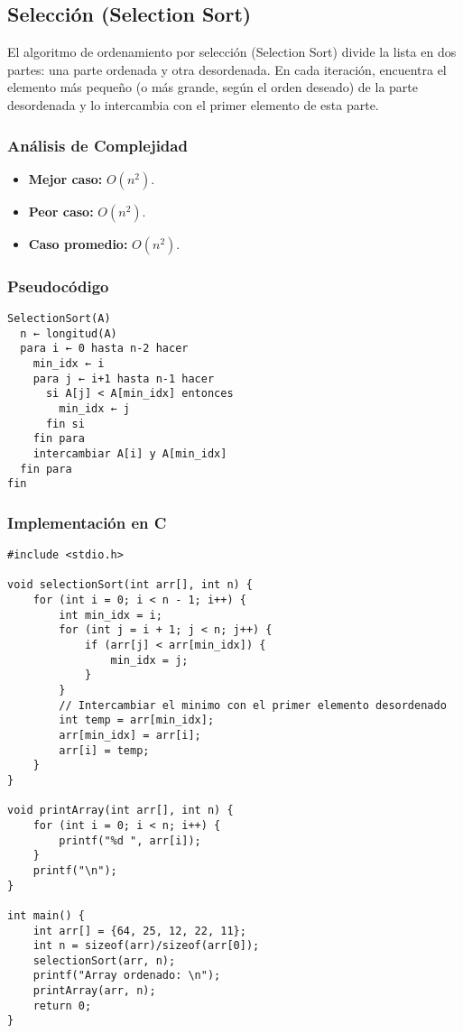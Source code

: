 \documentclass[11pt,openany]{book}
\begin{document}
\subsection{Selección (Selection Sort)}
El algoritmo de ordenamiento por selección (Selection Sort) divide la lista en dos partes: una parte ordenada y otra desordenada. En cada iteración, encuentra el elemento más pequeño (o más grande, según el orden deseado) de la parte desordenada y lo intercambia con el primer elemento de esta parte.

\subsubsection{Análisis de Complejidad}
\begin{itemize}
    \item \textbf{Mejor caso:} $O(n^2)$.
    \item \textbf{Peor caso:} $O(n^2)$.
    \item \textbf{Caso promedio:} $O(n^2)$.
\end{itemize}

\subsubsection{Pseudocódigo}
\begin{verbatim}
SelectionSort(A)
  n ← longitud(A)
  para i ← 0 hasta n-2 hacer
    min_idx ← i
    para j ← i+1 hasta n-1 hacer
      si A[j] < A[min_idx] entonces
        min_idx ← j
      fin si
    fin para
    intercambiar A[i] y A[min_idx]
  fin para
fin
\end{verbatim}

\subsubsection{Implementación en C}
\lstset{language=C}
\begin{lstlisting}
#include <stdio.h>

void selectionSort(int arr[], int n) {
    for (int i = 0; i < n - 1; i++) {
        int min_idx = i;
        for (int j = i + 1; j < n; j++) {
            if (arr[j] < arr[min_idx]) {
                min_idx = j;
            }
        }
        // Intercambiar el minimo con el primer elemento desordenado
        int temp = arr[min_idx];
        arr[min_idx] = arr[i];
        arr[i] = temp;
    }
}

void printArray(int arr[], int n) {
    for (int i = 0; i < n; i++) {
        printf("%d ", arr[i]);
    }
    printf("\n");
}

int main() {
    int arr[] = {64, 25, 12, 22, 11};
    int n = sizeof(arr)/sizeof(arr[0]);
    selectionSort(arr, n);
    printf("Array ordenado: \n");
    printArray(arr, n);
    return 0;
}
\end{lstlisting}
\end{document}
